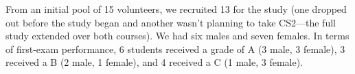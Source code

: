 From an initial pool of 15 volunteers, we recruited 13 for the study
(one dropped out before the study began and another wasn't planning to
take CS2---the full study extended over
both courses). We had six males and seven females. In terms of
first-exam performance, 6 students received a grade of A (3 male, 3
female), 3 received a B (2 male, 1 female), and 4 received a C (1
male, 3 female).



